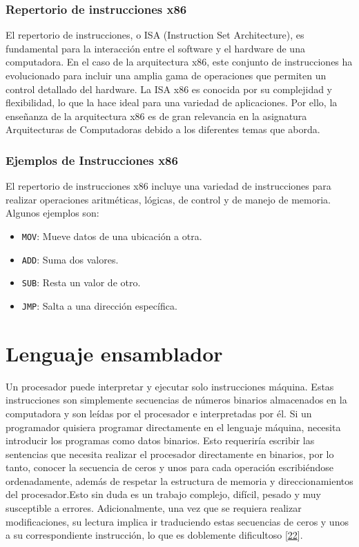 \documentclass[12pt,twoside]{templates/unerthesis}
\providecommand{\tightlist}{%
  \setlength{\itemsep}{0pt}\setlength{\parskip}{0pt}}
\begin{document}
\hypertarget{repertorio-de-instrucciones-x86}{%
\subsubsection{Repertorio de instrucciones x86}\label{repertorio-de-instrucciones-x86}}

El repertorio de instrucciones, o ISA (Instruction Set Architecture), es fundamental para la interacción entre el software y el hardware de una computadora. En el caso de la arquitectura x86, este conjunto de instrucciones ha evolucionado para incluir una amplia gama de operaciones que permiten un control detallado del hardware. La ISA x86 es conocida por su complejidad y flexibilidad, lo que la hace ideal para una variedad de aplicaciones.
Por ello, la enseñanza de la arquitectura x86 es de gran relevancia en la asignatura Arquitecturas de Computadoras debido a los diferentes temas que aborda.

\hypertarget{ejemplos-de-instrucciones-x86}{%
\subsubsection{Ejemplos de Instrucciones x86}\label{ejemplos-de-instrucciones-x86}}

El repertorio de instrucciones x86 incluye una variedad de instrucciones para realizar operaciones aritméticas, lógicas, de control y de manejo de memoria. Algunos ejemplos son:

\begin{itemize}
\tightlist
\item
  \texttt{MOV}: Mueve datos de una ubicación a otra.
\item
  \texttt{ADD}: Suma dos valores.
\item
  \texttt{SUB}: Resta un valor de otro.
\item
  \texttt{JMP}: Salta a una dirección específica.
\end{itemize}

\hypertarget{lenguaje-ensamblador}{%
\section{Lenguaje ensamblador}\label{lenguaje-ensamblador}}

Un procesador puede interpretar y ejecutar solo instrucciones máquina. Estas instrucciones son simplemente secuencias de números binarios almacenados en la computadora y son leídas por el procesador e interpretadas por él. Si un programador quisiera programar directamente en el lenguaje máquina, necesita introducir los programas como datos binarios. Esto requeriría escribir las sentencias que necesita realizar el procesador directamente en binarios, por lo tanto, conocer la secuencia de ceros y unos para cada operación escribiéndose ordenadamente, además de respetar la estructura de memoria y direccionamientos del procesador.Esto sin duda es un trabajo complejo, difícil, pesado y muy susceptible a errores. Adicionalmente, una vez que se requiera realizar modificaciones, su lectura implica ir traduciendo estas secuencias de ceros y unos a su correspondiente instrucción, lo que es doblemente dificultoso {[}\protect\hyperlink{ref-irvine2011assembly}{22}{]}.
\end{document}
